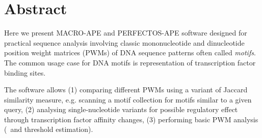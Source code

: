 \section{Abstract}
Here we present MACRO-APE and PERFECTOS-APE software designed for practical sequence analysis involving classic mononucleotide and dinucleotide position weight matrices (PWMs) of DNA sequence patterns often called \textit{motifs}. The common usage case for DNA motifs is representation of transcription factor binding sites.

The software allows (1) comparing different PWMs using a variant of Jaccard similarity measure, e.g. scanning a motif collection for motifs similar to a given query, (2) analysing single-nucleotide variants for possible regulatory effect through transcription factor affinity changes, (3) performing basic PWM analysis (\pvalue\ and threshold estimation).
